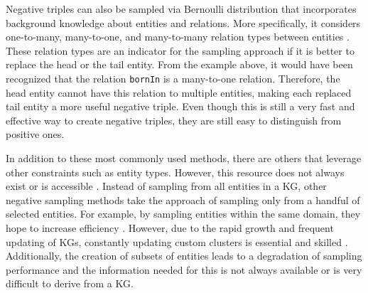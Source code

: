 Negative triples can also be sampled via Bernoulli distribution that incorporates background knowledge about entities and relations. 
More specifically, it considers one-to-many, many-to-one, and many-to-many relation types between entities \cite{zhang2021efficient}.
These relation types are an indicator for the sampling approach if it is better to replace the head or the tail entity.
From the example above, it would have been recognized that the relation \texttt{bornIn} is a many-to-one relation.
Therefore, the head entity cannot have this relation to multiple entities, making each replaced tail entity a more useful negative triple.
Even though this is still a very fast and effective way to create negative triples, they are still easy to distinguish from positive ones.

In addition to these most commonly used methods, there are others that leverage other constraints such as entity types.
However, this resource does not always exist or is accessible \cite{cai2017kbgan}.
Instead of sampling from all entities in a \ac{KG}, other negative sampling methods take the approach of sampling only from a handful of selected entities.
For example, by sampling entities within the same domain, they hope to increase efficiency \cite{qiannegative}.
However, due to the rapid growth and frequent updating of \acp{KG}, constantly updating custom clusters is essential and skilled \cite{qiannegative}. 
Additionally, the creation of subsets of entities leads to a degradation of sampling performance and the information needed for this is not always available or is very difficult to derive from a \ac{KG}.



 
 
 
